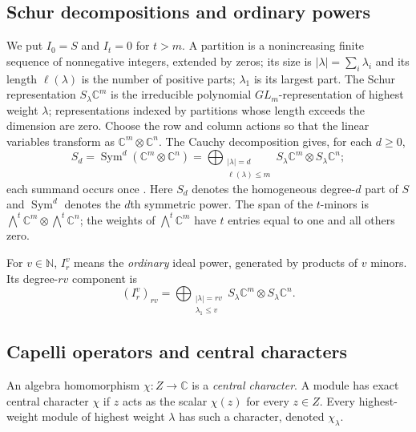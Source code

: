 \documentclass[11pt,a4paper]{article}
\numberwithin{equation}{section}
\theoremstyle{definition}
\newcommand{\C}{\mathbb C}
\newcommand{\N}{\mathbb N}
\begin{document}
\subsection{Schur decompositions and ordinary powers}\label{subsec:schur}
We put $I_0=S$ and $I_t=0$ for $t>m$. A partition is a nonincreasing finite sequence of
nonnegative integers, extended by zeros; its size is
$|\lambda|=\sum_i\lambda_i$ and its length $\ell(\lambda)$ is the number
of positive parts;
$\lambda_1$ is its largest part. The Schur representation
$S_\lambda\C^m$ is the irreducible polynomial $GL_m$-representation
of highest weight $\lambda$; representations indexed by partitions whose length
exceeds the dimension are zero. Choose the row and column actions
so that the linear variables transform as $\C^m\otimes\C^n$.
The Cauchy decomposition gives, for each $d\ge0$,
\begin{equation}\label{eq:cauchy}
S_d=\operatorname{Sym}^d(\C^m\otimes\C^n)
=\bigoplus_{\substack{|\lambda|=d\\\ell(\lambda)\le m}}
S_\lambda\C^m\otimes S_\lambda\C^n;
\end{equation}
each summand occurs once \cite[(2.1)]{Raicu}.
Here $S_d$ denotes the homogeneous degree-$d$ part of $S$ and
$\operatorname{Sym}^d$ denotes the $d$th symmetric power.
The span of the $t$-minors is
$\bigwedge^t\C^m\otimes\bigwedge^t\C^n$; the weights of
$\bigwedge^t\C^m$ have $t$ entries equal to one and all others zero.

For $v\in\N$, $I_r^v$ means the \emph{ordinary} ideal power, generated
by products of $v$ minors. Its degree-$rv$ component is
\cite[(5.4)]{Raicu}
\begin{equation}\label{eq:ordinary}
(I_r^v)_{rv}=
\bigoplus_{\substack{|\lambda|=rv\\\lambda_1\le v}}
S_\lambda\C^m\otimes S_\lambda\C^n.
\end{equation}

\subsection{Capelli operators and central characters}\label{subsec:central}
An algebra homomorphism $\chi:Z\to\C$ is a \emph{central character}.
A module has exact central character $\chi$ if $z$ acts as the scalar
$\chi(z)$ for every $z\in Z$. Every highest-weight module of highest
weight $\lambda$ has such a character, denoted $\chi_\lambda$.
\end{document}
